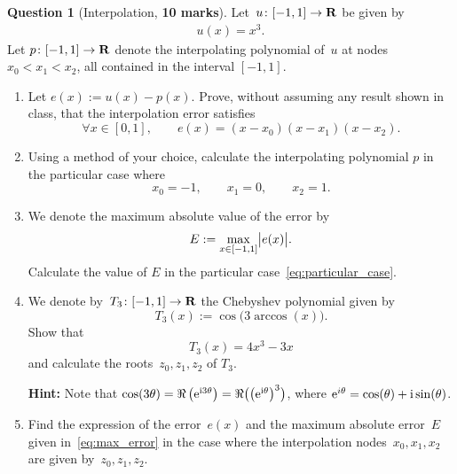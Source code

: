\documentclass[11pt]{article}
\theoremstyle{definition}
\newtheorem{question}{Question}
\theoremstyle{remark}
\theoremstyle{plain}%
\begin{document}
\newpage
\begin{question}
    [Interpolation, \textbf{10 marks}]
    Let~$u\colon [-1, 1] \to \real$ be given by
    \begin{align*}
        u(x) = x^3.
    \end{align*}
    Let $p \colon [-1, 1] \to \real$ denote the interpolating polynomial of~$u$ at nodes $x_0 < x_1 < x_2$,
    all contained in the interval $[-1, 1]$.
    \begin{enumerate}
        \itemsep0pt
        \item
            Let $e(x) := u(x) - p(x)$.
            Prove, without assuming any result shown in class,
            that the interpolation error satisfies
            \[
                \forall x \in [0, 1], \qquad
                e(x) = (x-x_0) (x-x_1) (x-x_2).
            \]

        \item
            Using a method of your choice,
            calculate the interpolating polynomial $p$ in the particular case where
            \begin{equation}
                \label{eq:particular_case}
                x_0 = -1, \qquad x_1 = 0, \qquad x_2 = 1.
            \end{equation}

        \item {}
            We denote the maximum absolute value of the error by
            \begin{equation}
                \label{eq:max_error}
                E := \max_{x \in [-1, 1]} \abs[\big]{e(x)}.
            \end{equation}
            Calculate the value of $E$ in the particular case~\eqref{eq:particular_case}.

        \item
            We denote by~$T_3 \colon [-1, 1] \to \real$ the Chebyshev polynomial given by
            \[
                T_3(x) := \cos\bigl(3 \arccos(x)\bigr).
            \]
            Show that
            \[
                T_3(x) = 4x^3 - 3x
            \]
            and calculate the roots~$z_0, z_1, z_2$ of $T_3$.

            \textbf{Hint:} Note that $\cos (3 \theta) = \Re \left( \e^{\i 3\theta} \right) = \Re \bigl( \left(\e^{\i \theta} \right)^3 \bigr)$, where $\e^{i \theta} = \cos (\theta) + \i \sin (\theta)$.

        \item
            Find the expression of the error~$e(x)$ and the maximum absolute error~$E$ given in~\eqref{eq:max_error}
            in the case where the interpolation nodes~$x_0, x_1, x_2$ are given by~$z_0, z_1, z_2$.


\end{enumerate}
\end{question}
\end{document}
